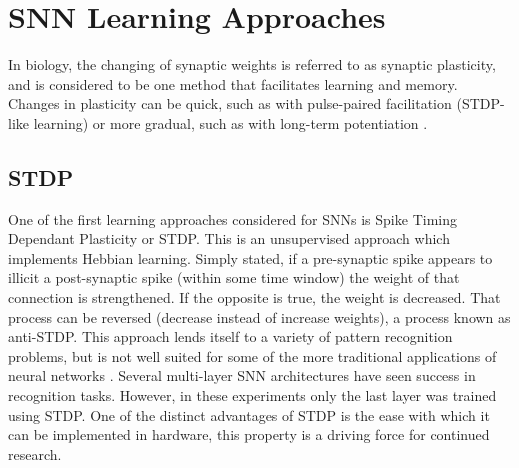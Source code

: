     
    \section{SNN Learning Approaches}
    In biology, the changing of synaptic weights is referred to as synaptic
    plasticity, and is considered to be one method that facilitates learning and
    memory. Changes in plasticity can be quick, such as with pulse-paired
    facilitation (STDP-like learning) or more gradual, such as with long-term
    potentiation \cite{ponulak_2011}.
    
    \subsection{STDP}
    One of the first learning approaches considered for SNNs is Spike Timing
    Dependant Plasticity or STDP. This is an unsupervised approach which
    implements Hebbian learning. Simply stated, if a pre-synaptic spike appears
    to illicit a post-synaptic spike (within some time window) the weight of
    that connection is strengthened. If the opposite is true, the weight is
    decreased. That process can be reversed (decrease instead of increase
    weights), a process known as anti-STDP. This approach lends itself to a
    variety of pattern recognition problems, but is not well suited for some of
    the more traditional applications of neural networks
    \cite{tavanaei_2019}. Several multi-layer SNN architectures have seen success
    in recognition tasks. However, in these experiments only the last layer was
    trained using STDP. One of the distinct advantages of STDP is the ease with
   which it can be implemented in hardware, this property is a driving force
    for continued research.
    
